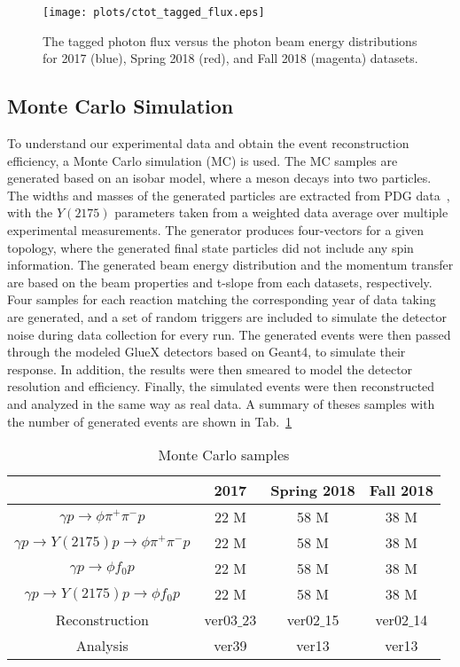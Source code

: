 \begin{figure}[H]
    \centering
    \texttt{[image: plots/ctot\_tagged\_flux.eps]}
    \caption{\label{fig.data_mc.data_tag_flux}The tagged photon flux versus the photon beam energy distributions for 2017 (blue), Spring 2018 (red), and Fall 2018 (magenta) datasets.}
\end{figure}

\subsection{Monte Carlo Simulation}
\label{sec.data_mc.mc}

To understand our experimental data and obtain the event reconstruction efficiency, a Monte Carlo simulation (MC) is used. The MC samples are generated based on an isobar model, where a meson decays into two particles. The widths and masses of the generated particles are extracted from PDG data~\cite{Tanabashi18}, with the $Y(2175)$ parameters taken from a weighted data average over multiple experimental measurements. The generator produces four-vectors for a given topology, where the generated final state particles did not include any spin information. The generated beam energy distribution and the momentum transfer are based on the beam properties and t-slope from each datasets, respectively. Four samples for each reaction matching the corresponding year of data taking are generated, and a set of random triggers are included to simulate the detector noise during data collection for every run. The generated events were then passed through the modeled GlueX detectors based on Geant4, to simulate their response. In addition, the results were then smeared to model the detector resolution and efficiency. Finally, the simulated events were then reconstructed and analyzed in the same way as real data. A summary of theses samples with the number of generated events are shown in Tab.~\ref{tab.data_mc.mc}   

\begin{table}[H]
    \centering
    \caption{Monte Carlo samples}
    \label{tab.data_mc.mc}
    \begin{tabular}{|c|c|c|c|}
        \hline
        & 2017 & Spring 2018 & Fall 2018 \\
        \hline
        $\gamma p \rightarrow \phi \pi^+ \pi^- p$ & 22 M & 58 M & 38 M \\
        \hline
        $\gamma p \rightarrow Y(2175) p \rightarrow \phi \pi^+ \pi^- p$ & 22 M & 58 M & 38 M \\
        \hline
        $\gamma p \rightarrow \phi f_0 p$ & 22 M & 58 M & 38 M \\
        \hline
        $\gamma p \rightarrow Y(2175) p \rightarrow \phi f_0 p$ & 22 M & 58 M & 38 M \\
        \hline
        Reconstruction & ver03$\_$23 & ver02$\_$15 & ver02$\_$14 \\
        \hline
        Analysis & ver39 & ver13 & ver13 \\
        \hline
    \end{tabular}
\end{table}

